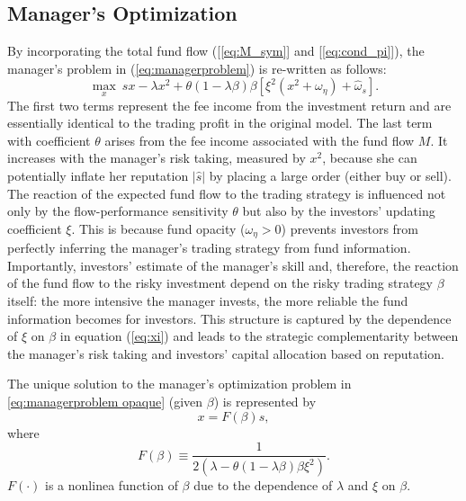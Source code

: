 \subsection{Manager's Optimization} \label{ss:optimization_opaque}
By incorporating the total fund flow ([\ref{eq:M_sym}] and [\ref{eq:cond_pi}]), the manager's problem in (\ref{eq:managerproblem}) is re-written as follows:
\begin{equation}
	\max_{x}\ sx - \lambda x^2 + \theta(1-\lambda\beta)\beta \left[\xi^2(x^2 + \omega_{\eta})+\hat{\omega}_{s}\right].\label{eq:managerproblem opaque}
\end{equation}
The first two terms represent the fee income from the investment return and are essentially identical to the trading profit in the original \citet{kyle1985continuous} model. The last term with coefficient $\theta$ arises from the fee income associated with the fund flow $M$. It increases with the manager's risk taking, measured by $x^2$, because she can potentially inflate her reputation $|\hat{s}|$ by placing a large order (either buy or sell). The reaction of the expected fund flow to the trading strategy is influenced not only by the flow-performance sensitivity $\theta$ but also by the investors' updating coefficient $\xi$. This is because fund opacity ($\omega_{\eta}>0$) prevents investors from perfectly inferring the manager's trading strategy from fund information. Importantly, investors' estimate of the manager's skill and, therefore, the reaction of the fund flow to the risky investment depend on the risky trading strategy $\beta$ itself: the more intensive the manager invests, the more reliable the fund information becomes for investors. This structure is captured by the dependence of $\xi$ on $\beta$ in equation (\ref{eq:xi}) and leads to the strategic complementarity between the manager's risk taking and investors' capital allocation based on reputation.

The unique solution to the manager's optimization problem in \eqref{eq:managerproblem opaque} (given $\beta$) is represented by
\begin{equation}
x=F(\beta)s,\label{x}
\end{equation}
where
\begin{equation}
F(\beta)\equiv\frac{1}{2\left(\lambda-\theta(1-\lambda\beta)\beta\xi^{2}\right)}.\label{F}
\end{equation}
$F(\cdot)$ is a nonlinea function of $\beta$ due to the dependence of $\lambda$ and $\xi$ on $\beta$. 

